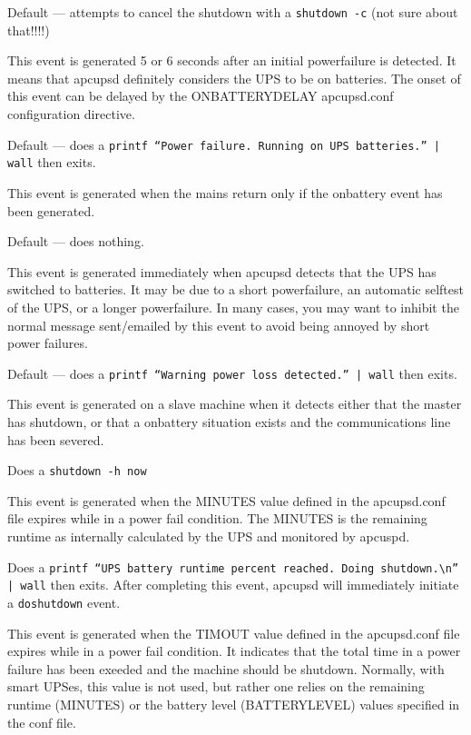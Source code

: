 {{{{{{\begin{description}
Default {---} attempts to cancel the shutdown with a {\tt shutdown -c} (not
sure about that!!!!)  

\item [onbattery]
   This event is generated 5 or 6 seconds after an initial powerfailure is
detected. It means that apcupsd definitely considers the UPS to be on
batteries. The onset of this event can be delayed by the ONBATTERYDELAY
apcupsd.conf configuration directive.  

Default {---} does a {\tt printf ``Power failure. Running on UPS batteries.''
| wall} then exits.  

\item [offbattery]
   This event is generated when the mains return only if the onbattery event has
been generated.  

Default {---} does nothing.  

\item [powerout]
   This event is generated immediately when apcupsd detects that the UPS has
switched to batteries. It may be due to a short powerfailure, an automatic
selftest of the UPS, or a longer powerfailure. In many cases, you may want to
inhibit the normal message sent/emailed by this event to avoid being annoyed
by short power failures.  

Default {---} does a {\tt printf ``Warning power loss detected.'' | wall} then
exits.  

\item [remotedown]
   This event is generated on a slave machine when it detects either that the
master has shutdown, or that a onbattery situation exists and the
communications line has been severed.  

Does a {\tt shutdown -h now}  

\item [runlimit]
   This event is generated when the MINUTES value defined in the apcupsd.conf
file expires while in a power fail condition. The MINUTES is the remaining
runtime as internally calculated by the UPS and monitored by apcuspd.  

Does a {\tt printf ``UPS battery runtime percent reached. Doing
shutdown.\textbackslash{}n'' | wall} then exits.  After completing this event,
apcupsd will immediately initiate a {\tt doshutdown} event.  

\item [timeout]
   This event is generated when the TIMOUT value defined in the apcupsd.conf file
expires while in a power fail condition. It indicates that the total time in a
power failure has been exeeded and the machine should be shutdown. Normally,
with smart UPSes, this value is not used, but rather one relies on the
remaining runtime (MINUTES) or the battery level (BATTERYLEVEL) values
specified in the conf file.  


\end{description}}}}}}}
